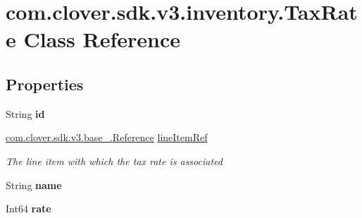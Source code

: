 \hypertarget{classcom_1_1clover_1_1sdk_1_1v3_1_1inventory_1_1_tax_rate}{}\section{com.\+clover.\+sdk.\+v3.\+inventory.\+Tax\+Rate Class Reference}
\label{classcom_1_1clover_1_1sdk_1_1v3_1_1inventory_1_1_tax_rate}
\subsection*{Properties}
\begin{DoxyCompactItemize}
\item 
\mbox{\label{classcom_1_1clover_1_1sdk_1_1v3_1_1inventory_1_1_tax_rate_aa8d6d92b2aecd16878a6a7f0c2911727}} 
String {\bfseries id}
\item 
\hyperlink{classcom_1_1clover_1_1sdk_1_1v3_1_1base___1_1_reference}{com.\+clover.\+sdk.\+v3.\+base\+\_\+.\+Reference} \hyperlink{classcom_1_1clover_1_1sdk_1_1v3_1_1inventory_1_1_tax_rate_ab451f4b66ebb3b62ac8dce6204f47a85}{line\+Item\+Ref}
\begin{DoxyCompactList}\small\item\em The line item with which the tax rate is associated \end{DoxyCompactList}\item 
\mbox{\label{classcom_1_1clover_1_1sdk_1_1v3_1_1inventory_1_1_tax_rate_aaef42056f284f60e0f2cee372d87bf05}} 
String {\bfseries name}
\item 
\mbox{\label{classcom_1_1clover_1_1sdk_1_1v3_1_1inventory_1_1_tax_rate_abaadea59cd5358b88cdcfcee50ce6a22}} 
Int64 {\bfseries rate}
\item 
\mbox{\label{classcom_1_1clover_1_1sdk_1_1v3_1_1inventory_1_1_tax_rate_a7e7861d25f19b6b9567639a12566a306}} 

\end{DoxyCompactItemize}
